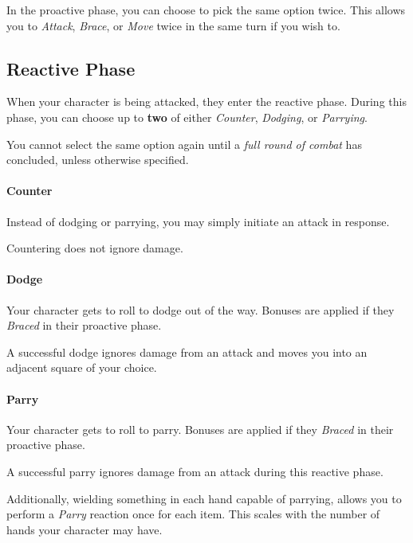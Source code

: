 \note In the proactive phase, you can choose to pick the same option twice. 
This allows you to \textit{Attack}, \textit{Brace}, or \textit{Move} twice in the same turn if you wish to.

\subsection{Reactive Phase}
When your character is being attacked, they enter the reactive phase.
During this phase, you can choose up to \textbf{two} of either \textit{Counter}, \textit{Dodging}, or \textit{Parrying}.

You cannot select the same option again until a \textit{full round of combat} has concluded, unless otherwise specified.

\paragraph{Counter}
Instead of dodging or parrying, you may simply initiate an attack in response.

Countering does not ignore damage.

\paragraph{Dodge}
Your character gets to roll to dodge out of the way.
Bonuses are applied if they \textit{Braced} in their proactive phase.

A successful dodge ignores damage from an attack and moves you into an adjacent square of your choice.

\paragraph{Parry}
Your character gets to roll to parry.
Bonuses are applied if they \textit{Braced} in their proactive phase.

A successful parry ignores damage from an attack during this reactive phase.

Additionally, wielding something in each hand capable of parrying, allows you to perform a \textit{Parry} reaction once for each item.
This scales with the number of hands your character may have.